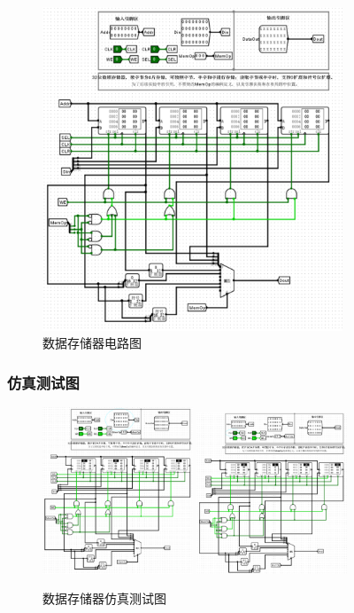 \documentclass{article}
\begin{document}
    \begin{figure}[H]
    \centering
    \includegraphics[width=0.8\textwidth]{1.4.2.png}
    \caption{数据存储器电路图}
    \end{figure}

    \subsubsection{仿真测试图}
    \begin{figure}[H]
    \centering
    \includegraphics[width=0.4\textwidth]{1.5.1.png}
    \includegraphics[width=0.4\textwidth]{1.5.2.png}
    
    \caption{数据存储器仿真测试图}
    \end{figure}
\end{document}
